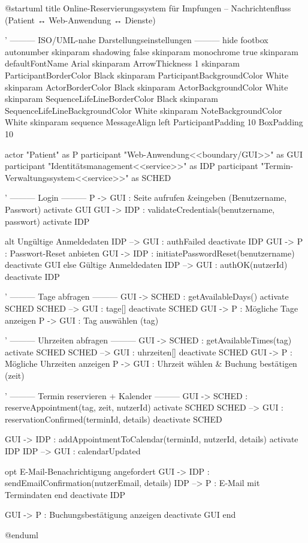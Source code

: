 \documentclass[12pt]{article}
\begin{document}
\begin{plantuml}
@startuml
title Online-Reservierungssystem für Impfungen – Nachrichtenfluss (Patient ↔ Web-Anwendung ↔ Dienste)

' ——— ISO/UML-nahe Darstellungseinstellungen ———
hide footbox
autonumber
skinparam shadowing false
skinparam monochrome true
skinparam defaultFontName Arial
skinparam ArrowThickness 1
skinparam ParticipantBorderColor Black
skinparam ParticipantBackgroundColor White
skinparam ActorBorderColor Black
skinparam ActorBackgroundColor White
skinparam SequenceLifeLineBorderColor Black
skinparam SequenceLifeLineBackgroundColor White
skinparam NoteBackgroundColor White
skinparam sequence {
  MessageAlign left
  ParticipantPadding 10
  BoxPadding 10
}

actor "Patient" as P
participant "Web-Anwendung\n<<boundary/GUI>>" as GUI
participant "Identitätsmanagement\n<<service>>" as IDP
participant "Termin-Verwaltungssystem\n<<service>>" as SCHED

' ——— Login ———
P -> GUI : Seite aufrufen &\nAnmeldedaten eingeben (Benutzername, Passwort)
activate GUI
GUI -> IDP : validateCredentials(benutzername, passwort)
activate IDP

alt Ungültige Anmeldedaten
  IDP --> GUI : authFailed
  deactivate IDP
  GUI -> P : Passwort-Reset anbieten
  GUI -> IDP : initiatePasswordReset(benutzername)
  deactivate GUI
else Gültige Anmeldedaten
  IDP --> GUI : authOK(nutzerId)
  deactivate IDP

  ' ——— Tage abfragen ———
  GUI -> SCHED : getAvailableDays()
  activate SCHED
  SCHED --> GUI : tage[]
  deactivate SCHED
  GUI -> P : Mögliche Tage anzeigen
  P -> GUI : Tag auswählen (tag)

  ' ——— Uhrzeiten abfragen ———
  GUI -> SCHED : getAvailableTimes(tag)
  activate SCHED
  SCHED --> GUI : uhrzeiten[]
  deactivate SCHED
  GUI -> P : Mögliche Uhrzeiten anzeigen
  P -> GUI : Uhrzeit wählen & Buchung bestätigen (zeit)

  ' ——— Termin reservieren + Kalender ———
  GUI -> SCHED : reserveAppointment(tag, zeit, nutzerId)
  activate SCHED
  SCHED --> GUI : reservationConfirmed(terminId, details)
  deactivate SCHED

  GUI -> IDP : addAppointmentToCalendar(terminId, nutzerId, details)
  activate IDP
  IDP --> GUI : calendarUpdated

  opt E-Mail-Benachrichtigung angefordert
    GUI -> IDP : sendEmailConfirmation(nutzerEmail, details)
    IDP --> P : E-Mail mit Termindaten
  end
  deactivate IDP

  GUI -> P : Buchungsbestätigung anzeigen
  deactivate GUI
end

@enduml
  
\end{plantuml}
\end{document}
